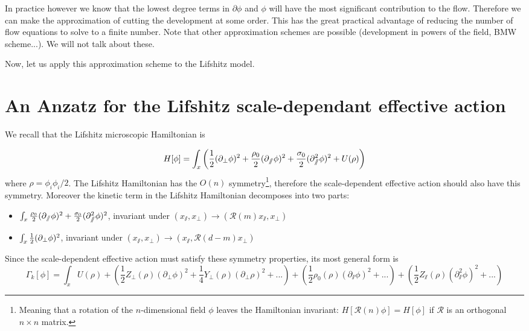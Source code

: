 In practice however we know that the lowest degree terms in $\partial \phi$ and $\phi$ will have the most significant contribution to the flow. Therefore we can make the approximation of cutting the development at some order. This has the great practical advantage of reducing the number of flow equations to solve to a finite number. Note that other approximation schemes are possible (development in powers of the field, BMW scheme...). We will not talk about these.

Now, let us apply this approximation scheme to the Lifshitz model.

\section{An Anzatz for the Lifshitz scale-dependant effective action}
We recall that the Lifshitz microscopic Hamiltonian is

\begin{equation}
H[\phi] = \int_x \left( \frac{1}{2}(\partial_{\perp} \phi)^2 + \frac{\rho_0}{2}(\partial_{\sslash} \phi)^2 + \frac{\sigma_0}{2} (\partial_{\sslash}^2 \phi)^2 + U(\rho) \right)
\end{equation}
where $\rho = \phi_i \phi_i/2$. 
The Lifshitz Hamiltonian has the $O(n)$ symmetry\footnote{Meaning that a rotation of the $n$-dimensional field $\phi$ leaves the Hamiltonian invariant: $H[\mathcal{R}(n)\phi] = H[\phi]$ if $\mathcal{R}$ is an orthogonal $n \times n$ matrix.}, therefore the scale-dependent effective action should also have this symmetry. Moreover the kinetic term in the Lifshitz Hamiltonian decomposes into two parts:
\begin{itemize}
\item $\int_{x} \frac{\rho_0}{2}(\partial_{\sslash} \phi)^2 + \frac{\sigma_0}{2} (\partial_{\sslash}^2 \phi)^2$, invariant under $\left(x_\sslash,x_\perp \right) \rightarrow \left(\mathcal{R}(m) x_\sslash, x_\perp\right)$
\item $\int_{x} \frac{1}{2}(\partial_{\perp} \phi)^2$, invariant under $\left(x_\sslash,x_\perp \right) \rightarrow \left(x_\sslash, \mathcal{R}(d-m) x_\perp\right)$
\end{itemize}
Since the scale-dependent effective action must satisfy these symmetry properties, its most general form is
\begin{equation}
\Gamma_k[\phi] = \int_{x} U(\rho) + \left( \frac{1}{2} Z_\perp(\rho) (\partial_\perp \phi)^2 + \frac{1}{4} Y_\perp(\rho) (\partial_\perp \rho)^2 + ... \right) + \left( \frac{1}{2} \rho_0(\rho) (\partial_\sslash \phi)^2 + ... \right) + \left( \frac{1}{2} Z_\sslash(\rho) (\partial_\sslash^2 \phi)^2 + ... \right)
\end{equation}


